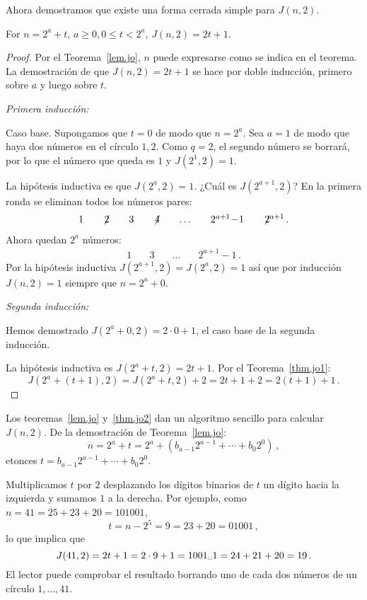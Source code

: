 Ahora demostramos que existe una forma cerrada simple para $J(n,2)$. 
\begin{theorem}\label{thm.jo2}
For $n=2^a+t$, $a\geq 0, 0\leq t < 2^a$, $J(n,2)=2t+1$.
\end{theorem}

\begin{proof}
Por el Teorema~\ref{lem.jo}, $n$ puede expresarse como se indica en el teorema. La demostración de que $J(n,2)=2t+1$ se hace por doble inducción, primero sobre $a$ y luego sobre $t$.

\textit{Primera inducción:}

Caso base. Supongamos que $t=0$ de modo que $n=2^a$. Sea $a=1$ de modo que haya dos números en el círculo $1,2$. Como $q=2$, el segundo número se borrará, por lo que el número que queda es $1$ y $J(2^1,2)=1$.

La hipótesis inductiva es que $J(2^a,2)=1$. ¿Cuál es $J(2^{a+1},2)$? En la primera ronda se eliminan todos los números pares:
\[
\begin{array}{rrrrrrrrrrrrrrrrrrrrrrrrrrrr}
1&\quad\not\! 2&\quad3&\quad\not\! 4& \quad\ldots&\quad 2^{a+1}\!-\!1&\quad \not\! 2^{a+1}\,.
\end{array}
\]
Ahora quedan $2^a$ números:
\[
\begin{array}{rrrrrrrrrrrrrrrrrrrrrrrrrrrr}
1&\quad3&\quad\ldots&\quad 2^{a+1}\!-\!1\,.
\end{array}
\]
Por la hipótesis inductiva $J(2^{a+1},2)=J(2^a,2)=1$ así que por inducción $J(n,2)=1$ siempre que $n=2^a+0$.

\textit{Segunda inducción:}

Hemos demostrado $J(2^a+0,2)=2\cdot 0 +1$, el caso base de la segunda inducción.

La hipótesis inductiva es $J(2^a+t,2)=2t+1$. Por el Teorema~\ref{thm.jo1}:
\[
J(2^a+(t+1),2)=J(2^a+t,2)+2=2t+1+2=2(t+1)+1\,.
\]
\end{proof}

Los teoremas~\ref{lem.jo} y~\ref{thm.jo2} dan un algoritmo sencillo para calcular $J(n,2)$. De la demostración de Teorema~\ref{lem.jo}:
\[
n=2^a+t=2^a+(b_{a-1}2^{a-1}+\cdots+b_{0}2^{0})\,,
\]
etonces $t=b_{a-1}2^{a-1}+\cdots+b_{0}2^{0}$.

Multiplicamos $t$ por $2$ desplazando los dígitos binarios de $t$ un dígito hacia la izquierda y sumamos $1$ a la derecha. Por ejemplo, como $n = 41 = 25  +  23  +  20  = 101001$,
\[
t = n - 2^5 = 9 = 23  +  20  = 01001\,,
\]
lo que implica que 
\[
J(41,2) = 2t + 1 = 2\cdot 9 + 1 =  1001\textrm{\textvisiblespace}1 = 24 + 21 + 20 = 19\,.
\]
El lector puede comprobar el resultado borrando uno de cada dos números de un círculo $1,\ldots,41$.

